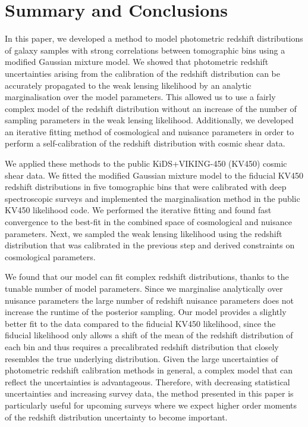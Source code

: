 \documentclass{aa}
\begin{document}
\section{Summary and Conclusions}
\label{sec:discussion}
In this paper, we developed a method to model photometric redshift distributions of galaxy samples with strong correlations between tomographic bins using a modified Gaussian mixture model. We showed that photometric redshift uncertainties arising from the calibration of the redshift distribution can be accurately propagated to the weak lensing likelihood by an analytic marginalisation over the model parameters.  This allowed us to use a fairly complex model of the redshift distribution without an increase of the number of sampling parameters in the weak lensing likelihood. Additionally, we developed an iterative fitting method of cosmological and nuisance parameters in order to perform a self-calibration of the redshift distribution with cosmic shear data.

We applied these methods to the public KiDS+VIKING-450 (KV450) cosmic shear data. We fitted the modified Gaussian mixture model to the fiducial KV450 redshift distributions in five tomographic bins that were calibrated with deep spectroscopic surveys and implemented the marginalisation method in the public KV450 likelihood code. We performed the iterative fitting and found fast convergence to the best-fit in the combined space of cosmological and nuisance parameters. Next, we sampled the weak lensing likelihood using the redshift distribution that was calibrated in the previous step and derived constraints on cosmological parameters.

We found that our model can fit complex redshift distributions, thanks to the tunable number of model parameters. Since we marginalise analytically over nuisance parameters the large number of redshift nuisance parameters does not increase the runtime of the posterior sampling. Our model provides a slightly better fit to the data compared to the fiducial KV450 likelihood, since the fiducial likelihood only allows a shift of the mean of the redshift distribution of each bin and thus requires a precalibrated redshift distribution that closely resembles the true underlying distribution. Given the large uncertainties of photometric redshift calibration methods in general, a complex model that can reflect the uncertainties is advantageous. Therefore, with decreasing statistical uncertainties and increasing survey data, the method presented in this paper is particularly useful for upcoming surveys where we expect higher order moments of the redshift distribution uncertainty to become important.
\end{document}
